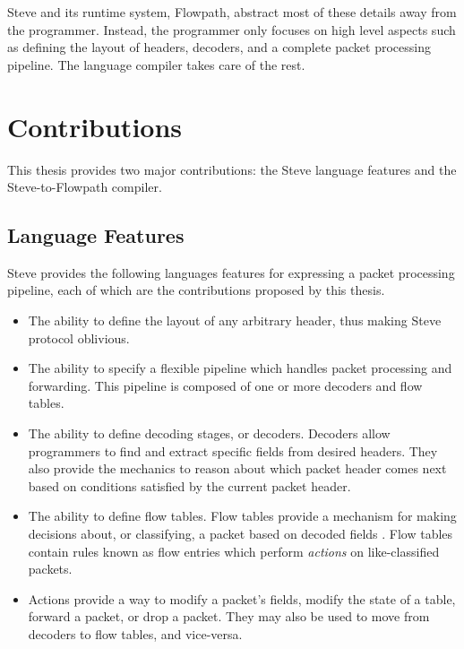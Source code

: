 Steve and its runtime system, Flowpath, abstract most of these details away from the programmer. Instead, the programmer only focuses on high level aspects such as defining the layout of headers, decoders, and a complete packet processing pipeline. The language compiler takes care of the rest. 

\section{Contributions}

This thesis provides two major contributions: the Steve language features and the Steve-to-Flowpath compiler.

\subsection{Language Features}

Steve provides the following languages features for expressing a packet processing pipeline, each of which are the contributions proposed by this thesis. 

\begin{itemize}
\item The ability to define the layout of any arbitrary header, thus making Steve protocol oblivious.

\item The ability to specify a flexible pipeline which handles packet processing and forwarding. This pipeline is composed of one or more decoders and flow tables.

\item The ability to define decoding stages, or decoders. Decoders allow programmers to find and extract specific fields from desired headers. They also provide the mechanics to reason about which packet header comes next based on conditions satisfied by the current packet header.

\item The ability to define flow tables. Flow tables provide a mechanism for making decisions about, or classifying, a packet based on decoded fields \cite{openflow_spec}. Flow tables contain rules known as flow entries which perform \textit{actions} on like-classified packets.

\item
Actions provide a way to modify a packet's fields, modify the state of a table, forward a packet, or drop a packet. They may also be used to move from decoders to flow tables, and vice-versa.

\end{itemize}

